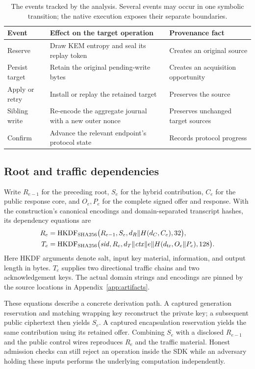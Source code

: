 \begin{table}[t]
\centering
\small
\begin{tabularx}{\linewidth}{@{}lXX@{}}
\toprule
Event & Effect on the target operation & Provenance fact \\
\midrule
Reserve & Draw KEM entropy and seal its replay token & Creates an original source \\
Persist target & Retain the original pending-write bytes & Creates an acquisition opportunity \\
Apply or retry & Install or replay the retained target & Preserves the source \\
Sibling write & Re-encode the aggregate journal with a new outer nonce & Preserves unchanged target sources \\
Confirm & Advance the relevant endpoint's protocol state & Records protocol progress \\
\bottomrule
\end{tabularx}
\caption{The events tracked by the analysis. Several events may occur in one
symbolic transition; the native execution exposes their separate boundaries.}
\label{tab:events}
\end{table}

\subsection{Root and traffic dependencies}

Write $R_{e-1}$ for the preceding root, $S_e$ for the hybrid contribution,
$C_e$ for the public response core, and $O_e,P_e$ for the complete signed
offer and response. With the construction's canonical encodings and
domain-separated transcript hashes, its dependency equations are
\begin{align}
R_e &=
 \operatorname{HKDF}_{\rm SHA256}
 \bigl(R_{e-1},S_e,d_R\Vert H(d_C,C_e),32\bigr), \label{eq:root}\\
T_e &=
 \operatorname{HKDF}_{\rm SHA256}
 \bigl(\mathit{sid},R_e,
 d_T\Vert\mathit{ctx}\Vert e\Vert H(d_{\rm tr},O_e\Vert P_e),128\bigr).
 \label{eq:traffic}
\end{align}
Here HKDF arguments denote salt, input key material, information, and output
length in bytes. $T_e$ supplies two directional traffic chains and two
acknowledgement keys. The actual domain strings and encodings are pinned by the
source locations in Appendix~\ref{app:artifacts}.

These equations describe a concrete derivation path. A captured generation
reservation and matching wrapping key reconstruct the private key; a subsequent
public ciphertext then yields $S_e$. A captured encapsulation reservation yields
the same contribution using its retained offer. Combining $S_e$ with a disclosed
$R_{e-1}$ and the public control wires reproduces $R_e$ and the traffic material.
Honest admission checks can still reject an operation inside the SDK while an
adversary holding these inputs performs the underlying computation independently.

